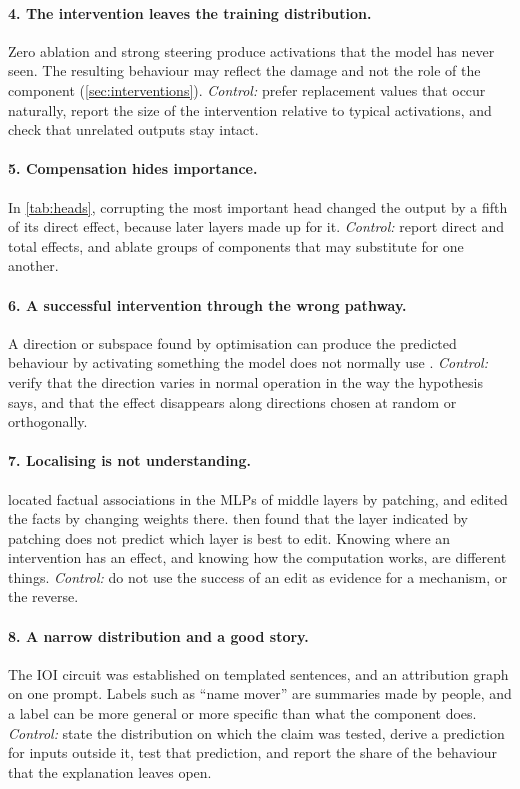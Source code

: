 \paragraph{4. The intervention leaves the training distribution.} Zero ablation and strong steering produce
activations that the model has never seen. The resulting behaviour may reflect the damage and not the role of
the component (\cref{sec:interventions}). \emph{Control:} prefer replacement values that occur naturally, report
the size of the intervention relative to typical activations, and check that unrelated outputs stay intact.

\paragraph{5. Compensation hides importance.} In \cref{tab:heads}, corrupting the most important head changed
the output by a fifth of its direct effect, because later layers made up for it. \emph{Control:} report direct
and total effects, and ablate groups of components that may substitute for one another.

\paragraph{6. A successful intervention through the wrong pathway.} A direction or subspace found by
optimisation can produce the predicted behaviour by activating something the model does not normally use
\citep{makelov2024subspace}. \emph{Control:} verify that the direction varies in normal operation in the way the
hypothesis says, and that the effect disappears along directions chosen at random or orthogonally.

\paragraph{7. Localising is not understanding.} \citet{meng2022locating} located factual associations in the
MLPs of middle layers by patching, and edited the facts by changing weights there. \citet{hase2023does} then
found that the layer indicated by patching does not predict which layer is best to edit. Knowing where an
intervention has an effect, and knowing how the computation works, are different things. \emph{Control:} do not
use the success of an edit as evidence for a mechanism, or the reverse.

\paragraph{8. A narrow distribution and a good story.} The IOI circuit was established on templated
sentences, and an attribution graph on one prompt. Labels such as ``name mover'' are summaries made by people,
and a label can be more general or more specific than what the component does. \emph{Control:} state the
distribution on which the claim was tested, derive a prediction for inputs outside it, test that prediction,
and report the share of the behaviour that the explanation leaves open.

